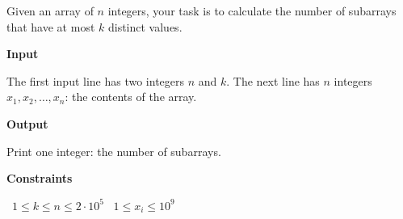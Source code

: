 Given an array of $n$ integers, your task is to calculate the number of subarrays that have at most $k$ distinct values.

\vspace{0.3cm}\noindent\textbf{Input}

The first input line has two integers $n$ and $k$.
The next line has $n$ integers $x_1,x_2,\dots,x_n$: the contents of the array.

\vspace{0.3cm}\noindent\textbf{Output}

Print one integer: the number of subarrays.

\vspace{0.3cm}\noindent\textbf{Constraints}

\textbullet\ $1 \le k \le n \le 2 \cdot 10^5$
\textbullet\ $1 \le x_i \le 10^9$